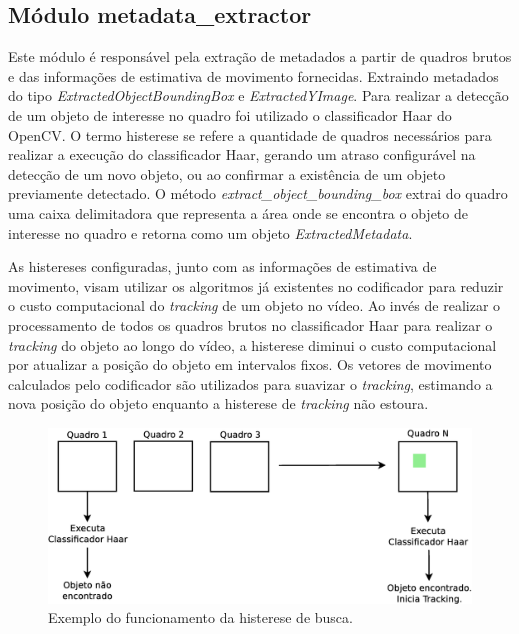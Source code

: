 \documentclass[12pt]{article}
\begin{document}
\subsection{ Módulo metadata\_extractor }

Este módulo é responsável pela extração de metadados a partir de quadros brutos e das informações de estimativa de movimento fornecidas. Extraindo metadados do tipo \textit{ExtractedObjectBoundingBox} e \textit{ExtractedYImage}. Para realizar a detecção de um objeto de interesse no quadro foi utilizado o classificador Haar do OpenCV. O termo histerese se refere a quantidade de quadros necessários para realizar a execução do classificador Haar, gerando um atraso configurável na detecção de um novo objeto, ou ao confirmar a existência de um objeto previamente detectado. O método \textit{extract\_object\_bounding\_box} extrai do quadro uma caixa delimitadora que representa a área onde se encontra o objeto de interesse no quadro e retorna como um objeto \textit{ExtractedMetadata}. 

As histereses configuradas, junto com as informações de estimativa de movimento, visam utilizar os algoritmos já existentes no codificador para reduzir o custo computacional do \textit{tracking} de um objeto no vídeo. Ao invés de realizar o processamento de todos os quadros brutos no classificador Haar para realizar o \textit{tracking} do objeto ao longo do vídeo, a histerese diminui o custo computacional por atualizar a posição do objeto em intervalos fixos. Os vetores de movimento calculados pelo codificador são utilizados para suavizar o \textit{tracking}, estimando a nova posição do objeto enquanto a histerese de \textit{tracking} não estoura.

\begin{figure}[H]
\centering
\includegraphics[scale=0.4]{../imagens/fig23.eps}
\caption{Exemplo do funcionamento da histerese de busca.}
\label{fig:search_histeresys_example_artigo}
\end{figure}
\end{document}
